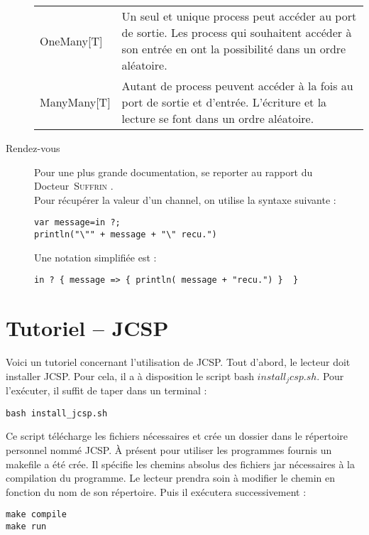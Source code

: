 \documentclass[a4paper,11pt,french]{report}
\begin{document}
\begin{description}
\begin{center}
\begin{tabular}{lp{}}
\textsf{OneMany[T]} & Un seul et unique process peut accéder au port de sortie. Les process qui souhaitent accéder à son entrée en ont la possibilité dans un ordre aléatoire.\\

\textsf{ManyMany[T]} & Autant de process peuvent accéder à la fois au port de sortie et d'entrée. L'écriture et la lecture se font dans un ordre aléatoire.\\
\end{tabular}
\end{center}

\item[Rendez-vous] Pour une plus grande documentation, se reporter au rapport du Docteur~\textsc{Suffrin} \cite{cpa2008-cso}.\\ 
Pour récupérer la valeur d'un \textsf{channel}, on utilise la syntaxe suivante :
\begin{verbatim}
var message=in ?; 
println("\"" + message + "\" recu.")
\end{verbatim}

Une notation simplifiée est :
\begin{verbatim}
in ? { message => { println( message + "recu.") }  }
\end{verbatim}             

\end{description}


\chapter[Tutoriel JCSP]{Tutoriel -- JCSP}

Voici un tutoriel concernant l'utilisation de JCSP. Tout d'abord, le lecteur doit installer JCSP. Pour cela, il a à disposition le script bash $install_jcsp.sh$. Pour l'exécuter, il suffit de taper dans un terminal :

\begin{lstlisting}[frame=trBL]
bash install_jcsp.sh
\end{lstlisting}

Ce script télécharge les fichiers nécessaires et crée un dossier dans le répertoire personnel nommé JCSP. \`A présent pour utiliser les programmes  fournis un makefile a été crée. Il spécifie les chemins absolus des fichiers jar nécessaires à la compilation du programme. Le lecteur prendra soin à modifier le chemin en fonction du nom de son répertoire. Puis il exécutera successivement :

\begin{lstlisting}[frame=trBL]
make compile
make run
\end{lstlisting}
\end{document}

